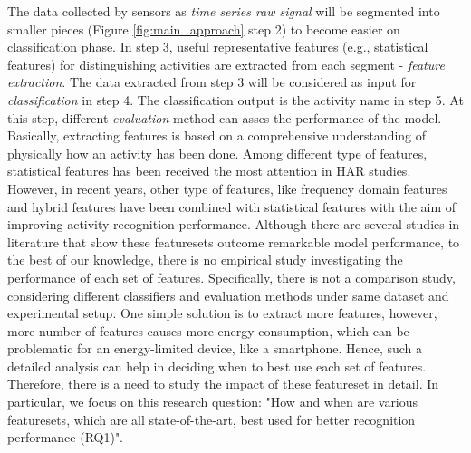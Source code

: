 \documentclass[journal,article,submit,moreauthors,pdftex]{Definitions/mdpi}
\begin{document}
%
 

The data collected by sensors as \textit{time series raw signal} will be segmented into smaller pieces (Figure \ref{fig:main_approach} step 2) to become easier on classification phase. In step 3, useful representative features (e.g., statistical features) for distinguishing activities are extracted from each segment - \textit{feature extraction}\cite{rosati2018comparison, wang2019survey}. The data extracted from step 3 will be considered as input for \textit{classification} in step 4. The classification output is the activity name in step 5. At this step, different \textit{evaluation} method can asses the performance of the model.\\
Basically, extracting features is based on a comprehensive understanding of physically how an activity has been done. Among different type of features, statistical features has been received the most attention in HAR studies. However, in recent years, other type of features, like frequency domain features and hybrid features have been combined with statistical features with the aim of improving activity recognition performance\cite{wang2019survey, morris2014recofit}. Although there are several studies in literature that show these featuresets outcome remarkable model performance, to the best of our knowledge, there is no empirical study investigating the performance of each set of features. Specifically, there is not a comparison study, considering different classifiers and evaluation methods under same dataset and experimental setup. One simple solution is to extract more features, however, more number of features causes more energy consumption, which can be problematic for an energy-limited device, like a smartphone\cite{Nourani_CoMoRea2019}. Hence, such a detailed analysis can help in deciding when to best use each set of features. Therefore, there is a need to study the impact of these featureset in detail. In particular, we focus on this research question: "How and when are various featuresets, which are all state-of-the-art, best used for better recognition performance (RQ1)".
\end{document}
